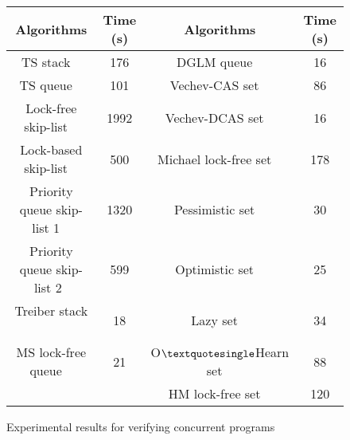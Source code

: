 \begin{figure}[]

\begin{tabular}{|c | c || c | c |}
  \hline
   \textsf{{\textbf{Algorithms}}} &  \textsf{{\textbf{Time (s)}}} & \textsf{{\textbf{Algorithms}}} &  \textsf{{\textbf{Time (s)}}}  \\

\hline
\hline

\textsf{TS stack  ~\cite{ts-stack}}  & \textsf{176} & \textsf{DGLM queue  ~\cite{Doherty:lockfree}}&  \textsf {16} \\
\hline

\textsf{TS queue  ~\cite{ts-stack}}& \textsf{101} & \textsf{Vechev-CAS set  ~\cite{Vechev:list}}  & \textsf{86} \\
\hline
\textsf{Lock-free skip-list   ~\cite{ArtOfMpP}}& \textsf{1992} & \textsf{Vechev-DCAS set  ~\cite{Vechev:list}}   & \textsf{16} \\
\hline

\textsf{Lock-based skip-list ~\cite{lockskiplist}}& \textsf{500} & \textsf{Michael lock-free set ~\cite{Michael:list}}  & \textsf{178} \\
\hline
 
\textsf{Priority queue skip-list 1 ~\cite{Shavit:ElimQueue}}  &  \textsf{1320} & \textsf{Pessimistic set  ~\cite{ArtOfMpP}}&\textsf{30}\\
\hline

\textsf{Priority queue skip-list 2~\cite{Linden:opodis13}}  &  \textsf{599} &\textsf{Optimistic set ~\cite{ArtOfMpP}}& \textsf{25}\\
\hline
\textsf{Treiber stack  ~\cite{Treiber:stack}} & \textsf {18} & \textsf{Lazy set ~\cite{Lazyset}  }  & \textsf {34}\\
\hline

\textsf{MS lock-free queue  ~\cite{MS:QueueAlgorithms}}& \textsf{21} & \textsf {O$\textquotesingle $Hearn set  ~\cite{OHearnlist}} & \textsf{88}\\
\hline

&   & \textsf{HM lock-free set  ~\cite{ArtOfMpP} } & \textsf{120}\\
\hline
\end{tabular}

\caption{Experimental results for verifying concurrent programs}
\label{Experiments:fig}
\end{figure}
